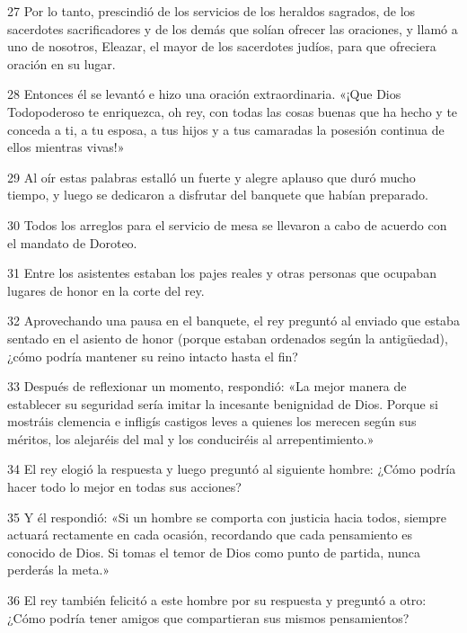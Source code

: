 \par 27 Por lo tanto, prescindió de los servicios de los heraldos sagrados, de los sacerdotes sacrificadores y de los demás que solían ofrecer las oraciones, y llamó a uno de nosotros, Eleazar, el mayor de los sacerdotes judíos, para que ofreciera oración en su lugar.

\par 28 Entonces él se levantó e hizo una oración extraordinaria. «¡Que Dios Todopoderoso te enriquezca, oh rey, con todas las cosas buenas que ha hecho y te conceda a ti, a tu esposa, a tus hijos y a tus camaradas la posesión continua de ellos mientras vivas!»

\par 29 Al oír estas palabras estalló un fuerte y alegre aplauso que duró mucho tiempo, y luego se dedicaron a disfrutar del banquete que habían preparado.

\par 30 Todos los arreglos para el servicio de mesa se llevaron a cabo de acuerdo con el mandato de Doroteo.

\par 31 Entre los asistentes estaban los pajes reales y otras personas que ocupaban lugares de honor en la corte del rey.

\par 32 Aprovechando una pausa en el banquete, el rey preguntó al enviado que estaba sentado en el asiento de honor (porque estaban ordenados según la antigüedad), ¿cómo podría mantener su reino intacto hasta el fin?

\par 33 Después de reflexionar un momento, respondió: «La mejor manera de establecer su seguridad sería imitar la incesante benignidad de Dios. Porque si mostráis clemencia e infligís castigos leves a quienes los merecen según sus méritos, los alejaréis del mal y los conduciréis al arrepentimiento.»

\par 34 El rey elogió la respuesta y luego preguntó al siguiente hombre: ¿Cómo podría hacer todo lo mejor en todas sus acciones?

\par 35 Y él respondió: «Si un hombre se comporta con justicia hacia todos, siempre actuará rectamente en cada ocasión, recordando que cada pensamiento es conocido de Dios. Si tomas el temor de Dios como punto de partida, nunca perderás la meta.»

\par 36 El rey también felicitó a este hombre por su respuesta y preguntó a otro: ¿Cómo podría tener amigos que compartieran sus mismos pensamientos?

